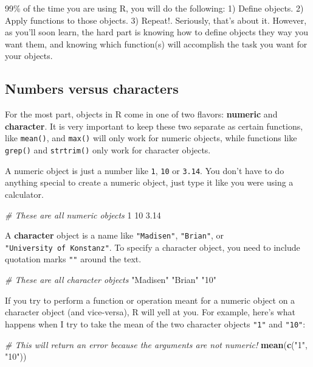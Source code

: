 \documentclass[]{book}
\newenvironment{Shaded}{\begin{snugshade}}{\end{snugshade}}
\newcommand{\KeywordTok}[1]{\textcolor[rgb]{0.13,0.29,0.53}{\textbf{{#1}}}}
\newcommand{\DecValTok}[1]{\textcolor[rgb]{0.00,0.00,0.81}{{#1}}}
\newcommand{\FloatTok}[1]{\textcolor[rgb]{0.00,0.00,0.81}{{#1}}}
\newcommand{\StringTok}[1]{\textcolor[rgb]{0.31,0.60,0.02}{{#1}}}
\newcommand{\CommentTok}[1]{\textcolor[rgb]{0.56,0.35,0.01}{\textit{{#1}}}}
\newcommand{\NormalTok}[1]{{#1}}
\theoremstyle{definition}
\theoremstyle{definition}
\theoremstyle{remark}
\begin{document}
99\% of the time you are using R, you will do the following: 1) Define
objects. 2) Apply functions to those objects. 3) Repeat!. Seriously,
that's about it. However, as you'll soon learn, the hard part is knowing
how to define objects they way you want them, and knowing which
function(s) will accomplish the task you want for your objects.

\subsection{Numbers versus characters}\label{numbers-versus-characters}

For the most part, objects in R come in one of two flavors:
\textbf{numeric} and \textbf{character}. It is very important to keep
these two separate as certain functions, like \texttt{mean()}, and
\texttt{max()} will only work for numeric objects, while functions like
\texttt{grep()} and \texttt{strtrim()} only work for character objects.

A numeric object is just a number like \texttt{1}, \texttt{10} or
\texttt{3.14}. You don't have to do anything special to create a numeric
object, just type it like you were using a calculator.

\begin{Shaded}
\begin{Highlighting}[]
\CommentTok{# These are all numeric objects}
\DecValTok{1}
\DecValTok{10}
\FloatTok{3.14}
\end{Highlighting}
\end{Shaded}

A \textbf{character} object is a name like \texttt{"Madisen"},
\texttt{"Brian"}, or \texttt{"University\ of\ Konstanz"}. To specify a
character object, you need to include quotation marks \texttt{""} around
the text.

\begin{Shaded}
\begin{Highlighting}[]
\CommentTok{# These are all character objects}
\StringTok{"Madisen"}
\StringTok{"Brian"}
\StringTok{"10"}
\end{Highlighting}
\end{Shaded}

If you try to perform a function or operation meant for a numeric object
on a character object (and vice-versa), R will yell at you. For example,
here's what happens when I try to take the mean of the two character
objects \texttt{"1"} and \texttt{"10"}:

\begin{Shaded}
\begin{Highlighting}[]
\CommentTok{# This will return an error because the arguments are not numeric!}
\KeywordTok{mean}\NormalTok{(}\KeywordTok{c}\NormalTok{(}\StringTok{"1"}\NormalTok{, }\StringTok{"10"}\NormalTok{))}
\end{Highlighting}
\end{Shaded}
\end{document}
